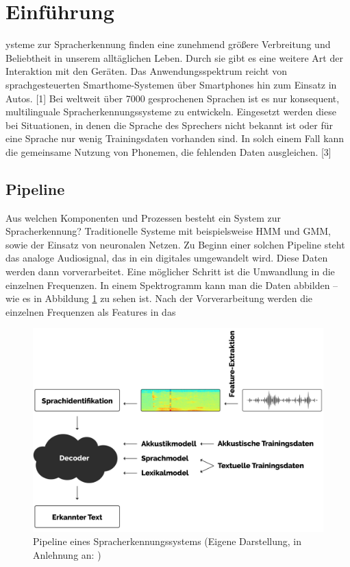 \section{Einführung}\label{sec:introduction}
ysteme zur Spracherkennung finden eine zunehmend größere Verbreitung und Beliebtheit in unserem alltäglichen Leben.
Durch sie gibt es eine weitere Art der Interaktion mit den Geräten.
Das Anwendungsspektrum reicht von sprachgesteuerten Smarthome-Systemen über Smartphones hin zum Einsatz in Autos. [1]
Bei weltweit über 7000 gesprochenen Sprachen ist es nur konsequent, multilinguale Spracherkennungssysteme zu entwickeln.
Eingesetzt werden diese bei Situationen, in denen die Sprache des Sprechers nicht bekannt ist oder für eine Sprache nur wenig
Trainingsdaten vorhanden sind. In solch einem Fall kann die gemeinsame Nutzung von Phonemen, die fehlenden Daten ausgleichen. [3]

\subsection{Pipeline}
Aus welchen Komponenten und Prozessen besteht ein System zur Spracherkennung?
Traditionelle Systeme mit beispielsweise HMM und GMM, sowie der Einsatz von neuronalen Netzen.
Zu Beginn einer solchen Pipeline steht das analoge Audiosignal, das in ein digitales umgewandelt wird.
Diese Daten werden dann vorverarbeitet. Eine möglicher Schritt ist die Umwandlung in die einzelnen Frequenzen.
In einem Spektrogramm kann man die Daten abbilden – wie es in Abbildung \ref{fig:pipeline} zu sehen ist.
Nach der Vorverarbeitung werden die einzelnen Frequenzen als Features in das

\begin{figure}[h!]
    \centering
    \includegraphics[width=1\linewidth]{images/pipeline}
    \caption{Pipeline eines Spracherkennungssystems (Eigene Darstellung, in Anlehnung an: \cite{Tom.2016}) }%
    \label{fig:pipeline}
\end{figure}

